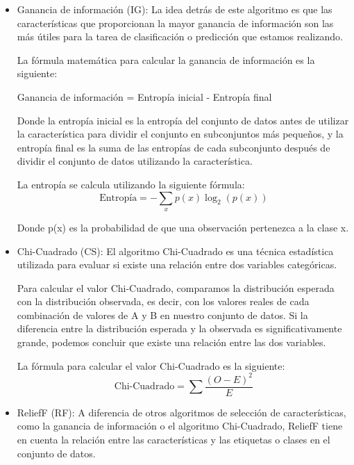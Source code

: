 \begin{itemize}
\item Ganancia de información (IG): La idea detrás de este algoritmo es que las características que proporcionan la mayor ganancia de información son las más útiles para la tarea de clasificación o predicción que estamos realizando.

La fórmula matemática para calcular la ganancia de información es la siguiente:

Ganancia de información = Entropía inicial - Entropía final

Donde la entropía inicial es la entropía del conjunto de datos antes de utilizar la característica para dividir el conjunto en subconjuntos más pequeños, y la entropía final es la suma de las entropías de cada subconjunto después de dividir el conjunto de datos utilizando la característica.

La entropía se calcula utilizando la siguiente fórmula:
\begin{equation}
\text{Entropía} = - \sum_{x} p(x) \log_{2}\left(p(x)\right)
	\label{eq:entropia}
\end{equation}

Donde p(x) es la probabilidad de que una observación pertenezca a la clase x.

\item Chi-Cuadrado (CS): El algoritmo Chi-Cuadrado es una técnica estadística utilizada para evaluar si existe una relación entre dos variables categóricas.

 Para calcular el valor Chi-Cuadrado, comparamos la distribución esperada con la distribución observada, es decir, con los valores reales de cada combinación de valores de A y B en nuestro conjunto de datos. Si la diferencia entre la distribución esperada y la observada es significativamente grande, podemos concluir que existe una relación entre las dos variables.

La fórmula para calcular el valor Chi-Cuadrado es la siguiente:
\begin{equation}
\text{Chi-Cuadrado} = \sum \frac{(O - E)^{2}}{E}
	\label{eq:chisqr}
\end{equation}

\item ReliefF (RF): A diferencia de otros algoritmos de selección de características, como la ganancia de información o el algoritmo Chi-Cuadrado, ReliefF tiene en cuenta la relación entre las características y las etiquetas o clases en el conjunto de datos.


\end{itemize}
